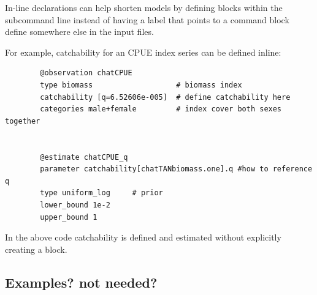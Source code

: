 In-line declarations can help shorten models by defining \command{} blocks within the subcommand line instead of having a label that points to a command block define somewhere else in the input files.

For example, catchability for an CPUE index series can be defined inline:

{\small{\begin{verbatim}
		@observation chatCPUE
		type biomass                   # biomass index
		catchability [q=6.52606e-005]  # define catchability here
		categories male+female         # index cover both sexes together


		@estimate chatCPUE_q
		parameter catchability[chatTANbiomass.one].q #how to reference q
		type uniform_log     # prior
		lower_bound 1e-2
		upper_bound 1
		\end{verbatim}}}

In the above code catchability is defined and estimated without explicitly creating a  block.

\subsection{Examples? not needed?}

